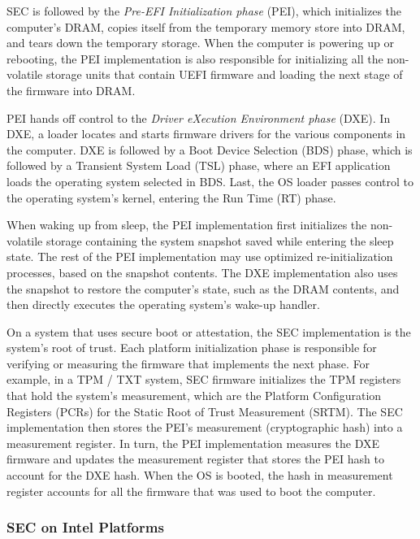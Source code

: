 SEC is followed by the \textit{Pre-EFI Initialization phase} (PEI), which
initializes the computer's DRAM, copies itself from the temporary memory
store into DRAM, and tears down the temporary storage. When the computer is
powering up or rebooting, the PEI implementation is also responsible for
initializing all the non-volatile storage units that contain UEFI firmware and
loading the next stage of the firmware into DRAM.

PEI hands off control to the \textit{Driver eXecution Environment phase} (DXE).
In DXE, a loader locates and starts firmware drivers for the various components
in the computer. DXE is followed by a Boot Device Selection (BDS) phase, which
is followed by a Transient System Load (TSL) phase, where an EFI application
loads the operating system selected in BDS. Last, the OS loader passes control
to the operating system's kernel, entering the Run Time (RT) phase.

When waking up from sleep, the PEI implementation first initializes the
non-volatile storage containing the system snapshot saved while entering the
sleep state. The rest of the PEI implementation may use optimized
re-initialization processes, based on the snapshot contents. The DXE
implementation also uses the snapshot to restore the computer's state, such as
the DRAM contents, and then directly executes the operating system's wake-up
handler.

On a system that uses secure boot or attestation, the SEC implementation is the
system's root of trust. Each platform initialization phase is responsible for
verifying or measuring the firmware that implements the next phase. For
example, in a TPM / TXT system, SEC firmware initializes the TPM registers that
hold the system's measurement, which are the Platform Configuration Registers
(PCRs) for the Static Root of Trust Measurement (SRTM). The SEC implementation
then stores the PEI's measurement (cryptographic hash) into a measurement
register. In turn, the PEI implementation measures the DXE firmware and updates
the measurement register that stores the PEI hash to account for the DXE hash.
When the OS is booted, the hash in measurement register accounts for all the
firmware that was used to boot the computer.


\subsubsection{SEC on Intel Platforms}
\label{sec:uefi_sec_details}


